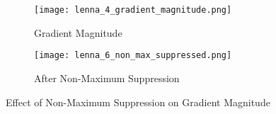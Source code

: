 \begin{figure}[ht]
    \centering
    \begin{subfigure}[b]{0.4\textwidth}
        \centering
        \texttt{[image: lenna\_4\_gradient\_magnitude.png]}
        \caption{Gradient Magnitude}
        \label{fig:gradient-magnitude-wo-nms}
    \end{subfigure}
    \hfill
    \begin{subfigure}[b]{0.4\textwidth}
        \centering
        \texttt{[image: lenna\_6\_non\_max\_suppressed.png]}
        \caption{After Non-Maximum Suppression}
        \label{fig:gradient-magnitude-with-nms}
    \end{subfigure}
    \caption{Effect of Non-Maximum Suppression on Gradient Magnitude}
    \label{fig:nms}
\end{figure}